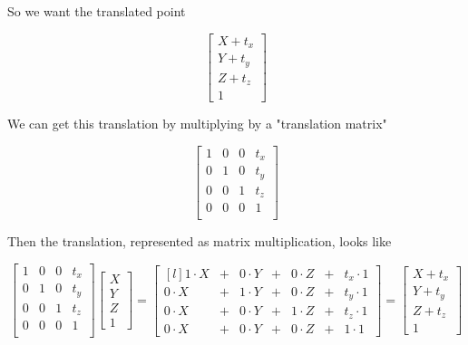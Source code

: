 \documentclass{article}
\theoremstyle{definition}
\begin{document}
\bigskip
\noindent
So we want the translated point

\begin{equation*}
\begin{bmatrix} X + t_x \\ Y + t_y \\ Z + t_z \\ 1 \end{bmatrix} 
\end{equation*}


\bigskip
\noindent
We can get this translation by multiplying by a "translation matrix"

\begin{equation*}
\begin{bmatrix}  1 & 0 & 0 & t_x \\ 
                          0 & 1 & 0 & t_y \\ 
                          0 & 0 & 1 & t_z \\
                          0 & 0 & 0 & 1     \\
\end{bmatrix} 
\end{equation*}


\bigskip
\noindent
Then the translation, represented as matrix multiplication, looks like


\begin{equation*}
\begin{bmatrix}  1 & 0 & 0 & t_x \\ 
                          0 & 1 & 0 & t_y \\ 
                          0 & 0 & 1 & t_z \\
                          0 & 0 & 0 & 1     \\
\end{bmatrix} 
\begin{bmatrix} X \\ Y \\ Z \\ 1 \end{bmatrix} =
\begin{bmatrix*}[l]
1 \cdot X  &+& 0 \cdot Y &+& 0 \cdot Z   &+&  t_x \cdot 1 \\
0 \cdot X  &+& 1 \cdot Y  &+& 0 \cdot Z  &+&  t_y \cdot 1\\
0 \cdot X  &+& 0 \cdot Y  &+& 1 \cdot Z  &+&  t_z \cdot 1\\
0 \cdot X  &+& 0 \cdot Y  &+& 0 \cdot Z   &+& 1 \cdot 1
\end{bmatrix*} =
\begin{bmatrix} X + t_x \\ Y + t_y \\ Z + t_z \\ 1 \end{bmatrix} 
\end{equation*}
\end{document}
